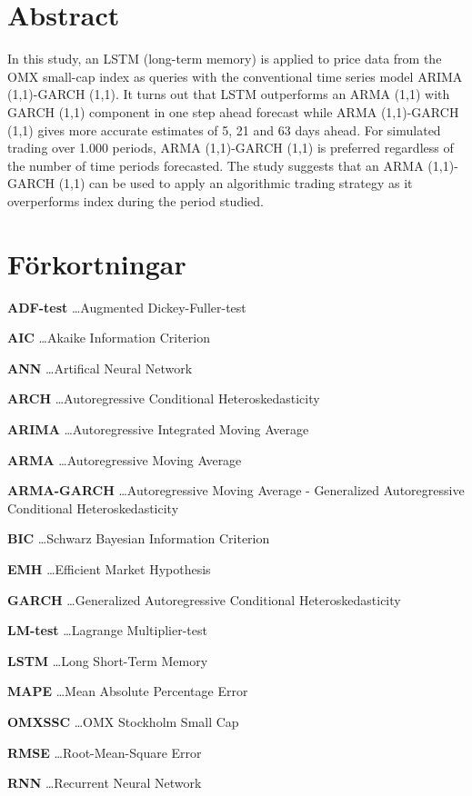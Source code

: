 \documentclass[11pt]{article}
\numberwithin{equation}{section}
\numberwithin{table}{section}
\numberwithin{figure}{section}
\begin{document}
\section*{Abstract}
In this study, an LSTM (long-term memory) is applied to price data from the OMX small-cap index as queries with the conventional time series model ARIMA (1,1)-GARCH (1,1). It turns out that LSTM outperforms an ARMA (1,1) with GARCH (1,1) component in one step ahead forecast while ARMA (1,1)-GARCH (1,1) gives more accurate estimates of 5, 21 and 63 days ahead. For simulated trading over 1.000 periods, ARMA (1,1)-GARCH (1,1) is preferred regardless of the number of time periods forecasted. The study suggests that an ARMA (1,1)-GARCH (1,1) can be used to apply an algorithmic trading strategy as it overperforms index during the period studied.


\newpage
\thispagestyle{empty}
{\fontsize{11pt}{11.5pt}\selectfont %
    \tableofcontents
}
\thispagestyle{empty}
\newpage

\newpage 
\thispagestyle{empty}

\section*{Förkortningar}
\textbf{ADF-test} \dots Augmented Dickey-Fuller-test \par
\textbf{AIC} \dots Akaike Information Criterion \par
\textbf{ANN} \dots Artifical Neural Network \par
\textbf{ARCH} \dots Autoregressive Conditional Heteroskedasticity \par
\textbf{ARIMA} \dots Autoregressive Integrated Moving Average \par
\textbf{ARMA} \dots Autoregressive Moving Average \par 
\textbf{ARMA-GARCH} \dots Autoregressive Moving Average - Generalized Autoregressive Conditional Heteroskedasticity \par 
\textbf{BIC} \dots Schwarz Bayesian Information Criterion \par
\textbf{EMH} \dots Efficient Market Hypothesis \par
\textbf{GARCH} \dots Generalized Autoregressive Conditional Heteroskedasticity \par
\textbf{LM-test} \dots Lagrange Multiplier-test \par
\textbf{LSTM} \dots Long Short-Term Memory \par
\textbf{MAPE} \dots Mean Absolute Percentage Error \par
\textbf{OMXSSC} \dots OMX Stockholm Small Cap \par
\textbf{RMSE} \dots Root-Mean-Square Error \par
\textbf{RNN} \dots Recurrent Neural Network \par
\end{document}
